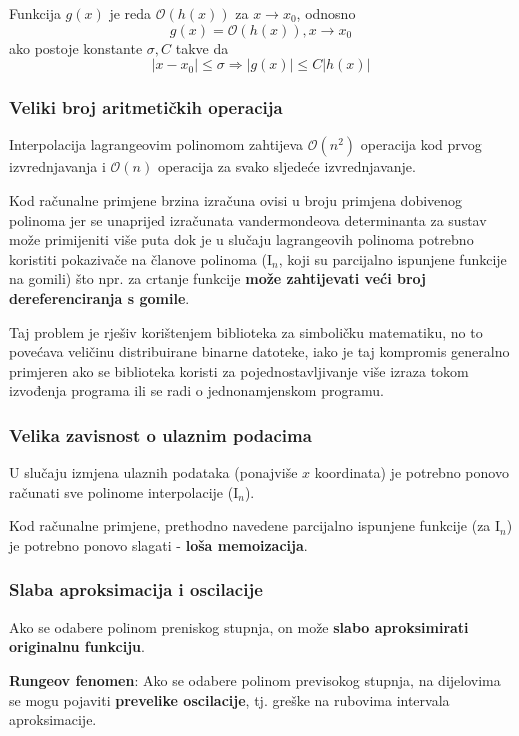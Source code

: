 \begin{definition}
    Funkcija $g(x)$ je reda $\mathcal{O}(h(x))$ za $x \to x_0$, odnosno
    $$
    g(x) = \mathcal{O}(h(x)), x\to x_0
    $$
    ako postoje konstante $\sigma, C$ takve da
    $$
    |x-x_0| \leq \sigma \Rightarrow |g(x)| \leq C|h(x)|
    $$
\end{definition}

\subsubsection{Veliki broj aritmetičkih operacija}

Interpolacija lagrangeovim polinomom zahtijeva $\mathcal{O}(n^2)$ operacija kod prvog izvrednjavanja i $\mathcal{O}(n)$ operacija za svako sljedeće izvrednjavanje.

Kod računalne primjene brzina izračuna ovisi u broju primjena dobivenog polinoma jer se unaprijed izračunata vandermondeova determinanta za sustav može primijeniti više puta dok je u slučaju lagrangeovih polinoma potrebno koristiti pokazivače na članove polinoma ($\mathrm{I}_n$, koji su parcijalno ispunjene funkcije na gomili) što npr. za crtanje funkcije \textbf{može zahtijevati veći broj dereferenciranja s gomile}.

Taj problem je rješiv korištenjem biblioteka za simboličku matematiku, no to povećava veličinu distribuirane binarne datoteke, iako je taj kompromis generalno primjeren ako se biblioteka koristi za pojednostavljivanje više izraza tokom izvođenja programa ili se radi o jednonamjenskom programu.

\subsubsection{Velika zavisnost o ulaznim podacima}

U slučaju izmjena ulaznih podataka (ponajviše $x$ koordinata) je potrebno ponovo računati sve polinome interpolacije ($\mathrm{I}_n$).

Kod računalne primjene, prethodno navedene parcijalno ispunjene funkcije (za $\mathrm{I}_n$) je potrebno ponovo slagati - \textbf{loša memoizacija}.

\subsubsection{Slaba aproksimacija i oscilacije}

Ako se odabere polinom preniskog stupnja, on može \textbf{slabo aproksimirati originalnu funkciju}.

\textbf{Rungeov fenomen}: Ako se odabere polinom previsokog stupnja, na dijelovima se mogu pojaviti \textbf{prevelike oscilacije}, tj. greške na rubovima intervala aproksimacije.
